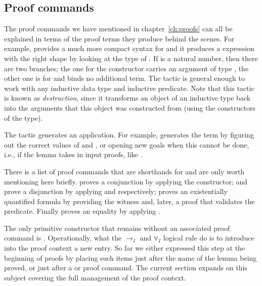 \subsection{Proof commands}
  The proof commands we have mentioned in chapter~\ref{ch:proofs} can all be
explained in terms of the proof terms they produce behind the scenes.
For example,  provides a much more compact syntax
for  and it produces a
 expression with the right
shape by looking at the type of .  If  is a natural number, then there
are two branches; the one for the  constructor carries an argument of type
, the other one is for  and binds no additional term.
The  tactic is general enough to work with any inductive data type
and inductive predicate. Note that this tactic is known as
\emph{destruction}, since it transforms an object of an inductive type
back into the arguments that this object was constructed from (using
the constructors of the type).

The  tactic generates an application.  For example, 
generates the term  by figuring out the correct values of
 and , or opening new goals when this cannot be done, i.e.,
if the lemma takes in input proofs, like .

There is a list of proof commands that are shorthands for 
and are only worth mentioning here briefly.  proves a conjunction
by applying the  constructor;  and  prove a
disjunction by applying  and  respectively;
 proves an existentially quantified formula by providing
the witness  and, later, a proof that  validates the predicate.
Finally  proves an equality by applying .

The only primitive constructor that remains without an associated proof command
is .  Operationally, what the $\to_I$ and
$\forall_I$ logical rule do is to introduce into the proof context a
new entry.  So far we either expressed this step at the beginning of proofs
by placing such items just after the name of the lemma being proved, or
just after a  or  proof command.  The current section
expands on this subject covering the full management of the proof context.

